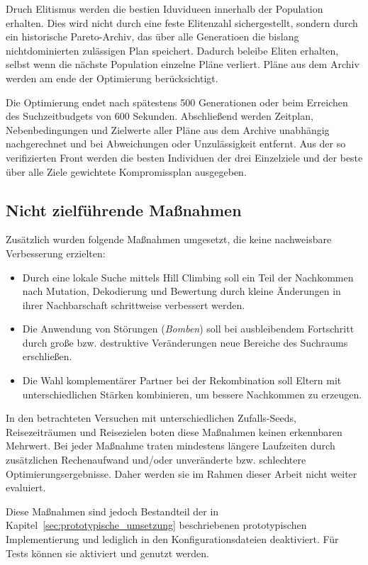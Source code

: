 Druch Elitismus werden die bestien Iduvidueen innerhalb der Population erhalten. Dies wird nicht durch eine feste Elitenzahl sichergestellt, sondern durch ein historische Pareto-Archiv, das über alle Generatioen die bislang nichtdominierten zulässigen Plan speichert. Dadurch beleibe Eliten erhalten, selbst wenn die nächste Population einzelne Pläne verliert. Pläne aus dem Archiv werden am ende der Optimierung berücksichtigt.

Die Optimierung endet nach spätestens 500 Generationen oder beim Erreichen des Suchzeitbudgets von 600 Sekunden. Abschließend werden Zeitplan, Nebenbedingungen und Zielwerte aller Pläne aus dem Archive unabhängig nachgerechnet und bei Abweichungen oder Unzulässigkeit entfernt. Aus der so verifizierten Front werden die besten Individuen der drei Einzelziele und der beste über alle Ziele gewichtete Kompromissplan ausgegeben.

\subsection{Nicht zielführende Maßnahmen}

Zusätzlich wurden folgende Maßnahmen umgesetzt, die keine nachweisbare Verbesserung erzielten:
\begin{itemize}
  \item Durch eine lokale Suche mittels Hill Climbing soll ein Teil der Nachkommen nach Mutation, Dekodierung und Bewertung durch kleine Änderungen in ihrer Nachbarschaft schrittweise verbessert werden.
  \item Die Anwendung von Störungen (\textit{Bomben}) soll bei ausbleibendem Fortschritt durch große bzw. destruktive Veränderungen neue Bereiche des Suchraums erschließen.
  \item Die Wahl komplementärer Partner bei der Rekombination soll Eltern mit unterschiedlichen Stärken kombinieren, um bessere Nachkommen zu erzeugen.
\end{itemize}

In den betrachteten Versuchen mit unterschiedlichen Zufalls-Seeds, Reisezeiträumen und Reisezielen boten diese Maßnahmen keinen erkennbaren Mehrwert. Bei jeder Maßnahme traten mindestens längere Laufzeiten durch zusätzlichen Rechenaufwand und/oder unveränderte bzw. schlechtere Optimierungsergebnisse. Daher werden sie im Rahmen dieser Arbeit nicht weiter evaluiert.

Diese Maßnahmen sind jedoch Bestandteil der in Kapitel~\ref{sec:prototypische_umsetzung} beschriebenen prototypischen Implementierung und lediglich in den Konfigurationsdateien deaktiviert. Für Tests können sie aktiviert und genutzt werden.

